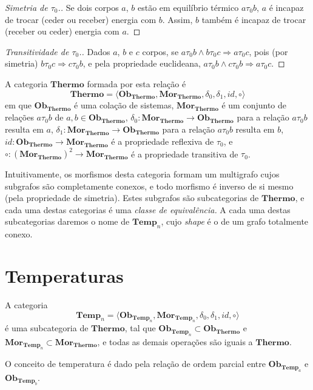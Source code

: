\documentclass[a4paper]{article}
\newcommand{\trls}{{\tau_0}}
\newcommand{\trl}[2]{{#1 \trls #2}}
\newcommand{\termo}{{\mathbf{Thermo}}}
\newcommand{\obtermo}{{\mathbf{Ob}_\termo}}
\newcommand{\mortermo}{{\mathbf{Mor}_\termo}}
\newcommand{\tempn}[1]{{\mathbf{Temp}_{#1}}}
\newcommand{\temp}{{\tempn{n}}}
\newcommand{\obtempn}[1]{{\mathbf{Ob}_{\tempn{#1}}}}
\newcommand{\mortempn}[1]{{\mathbf{Mor}_{\tempn{#1}}}}
\newcommand{\obtemp}{{\obtempn{n}}}
\newcommand{\mortemp}{{\mortempn{n}}}
\begin{document}
\begin{proof}[Simetria de $\trls$.] \label{pr:simetria}
Se dois corpos $a$, $b$ estão em equilíbrio térmico $\trl{a}{b}$, $a$ é incapaz de trocar (ceder ou receber) energia com $b$. Assim, $b$ também é incapaz de trocar (receber ou ceder) energia com $a$. 
\end{proof}

\begin{proof}[Transitividade de $\trls$.] \label{pr:transitividade}
Dados $a$, $b$ e $c$ corpos, se $\trl{a}{b} \wedge \trl{b}{c} \Rightarrow \trl{a}{c}$, pois (por simetria) $\trl{b}{c} \Rightarrow \trl{c}{b}$, e pela propriedade euclideana, $\trl{a}{b} \wedge \trl{c}{b} \Rightarrow \trl{a}{c}$.
\end{proof}

A categoria $\termo$ formada por esta relação é
\begin{equation} \label{ma:termo}
\termo = \langle \obtermo, \mortermo, \delta_0, \delta_1, id, \circ \rangle
\end{equation}
em que $\obtermo$ é uma colação de sistemas, $\mortermo$ é um conjunto de relações $\trl{a}{b}$ de $a,b \in \obtermo$, $\delta_0: \mortermo \to \obtermo$ para a relação $\trl{a}{b}$ resulta em $a$, $\delta_1: \mortermo \to \obtermo$ para a relação $\trl{a}{b}$ resulta em $b$, $id: \obtermo \to \mortermo$ é a propriedade reflexiva de $\trls$, e $\circ: (\mortermo)^2 \to \mortermo$ é a propriedade transitiva de $\trls$.

Intuitivamente, os morfismos desta categoria formam um multigrafo cujos subgrafos são completamente conexos, e todo morfismo é inverso de si mesmo (pela propriedade de simetria). Estes subgrafos são subcategorias de $\termo$, e cada uma destas categorias é uma {\it classe de equivalência.} A cada uma destas subcategorias daremos o nome de $\temp$, cujo {\it shape} é o de um grafo totalmente conexo.

\section*{Temperaturas}
A categoria
\begin{equation} \label{cat:temp}
\temp = \langle \obtemp, \mortemp, \delta_0, \delta_1, id, \circ\rangle
\end{equation}
é uma subcategoria de $\termo$, tal que $\obtemp \subset \obtermo$ e $\mortemp \subset \mortermo$, e todas as demais operações são iguais a $\termo$.

O conceito de temperatura é dado pela relação de ordem parcial entre $\obtempn{a}$ e $\obtempn{b}$.
\end{document}
